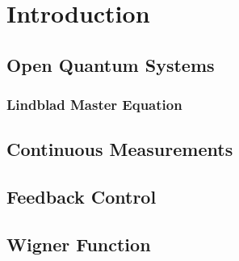 \section{Introduction}
\subsection{Open Quantum Systems}
\subsubsection{Lindblad Master Equation}
\subsection{Continuous Measurements}
\subsection{Feedback Control}
\subsection{Wigner Function}